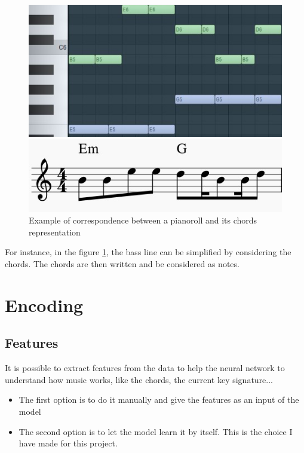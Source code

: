 \documentclass[12pt]{report}
\begin{document}
\begin{figure}[H]
   \begin{minipage}{0.5\textwidth}
     \centering
     \includegraphics[width=.9\linewidth]{images/music/pianoroll/pianoroll_small.jpg}
   \end{minipage}\hfill
   \begin{minipage}{0.5\textwidth}
     \centering
     \includegraphics[width=.9\linewidth]{images/music/stave/stave_with_chords.jpg}
   \end{minipage}
 \caption{Example of correspondence between a pianoroll and its chords representation}
 \label{fig:pianoroll_to_chords}
\end{figure}

For instance, in the figure \ref{fig:pianoroll_to_chords}, the bass line can be simplified by considering the chords.
The chords are then written and be considered as notes.


\section{Encoding}
\label{sec:related-works:encoding}

\subsection{Features}

It is possible to extract features from the data to help the neural network to understand how music works, like the chords, the current key signature...
\begin{itemize}
    \item The first option is to do it manually and give the features as an input of the model
    \item The second option is to let the model learn it by itself. This is the choice I have made for this project.
\end{itemize}
\end{document}
